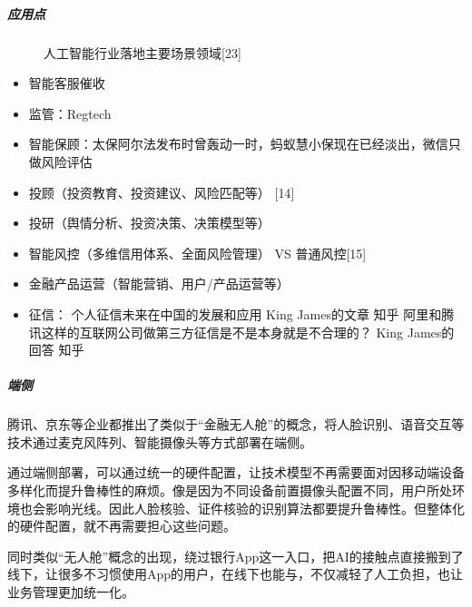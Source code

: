 \documentclass[letterpaper,11pt,english]{sphinxmanual}
\begin{document}
\subparagraph{应用点}
\label{\detokenize{chapter_project/AI_Finance:id3}}
\begin{figure}[H]
\centering
\capstart

\noindent{}
\caption{人工智能行业落地主要场景领域{[}23{]}}\label{\detokenize{chapter_project/AI_Finance:id31}}\end{figure}
\begin{itemize}
\item {} 
智能客服催收

\item {} 
监管：Regtech

\item {} 
智能保顾：太保阿尔法发布时曾轰动一时，蚂蚁慧小保现在已经淡出，微信只做风险评估

\item {} 
投顾（投资教育、投资建议、风险匹配等） {[}14{]}

\item {} 
投研（舆情分析、投资决策、决策模型等）

\item {} 
智能风控（多维信用体系、全面风险管理） VS 普通风控{[}15{]}

\item {} 
金融产品运营（智能营销、用户/产品运营等）

\item {} 
征信： 个人征信未来在中国的发展和应用 \sphinxhyphen{} King James的文章 \sphinxhyphen{} 知乎
阿里和腾讯这样的互联网公司做第三方征信是不是本身就是不合理的？ \sphinxhyphen{} King
James的回答 \sphinxhyphen{} 知乎

\end{itemize}


\subparagraph{端侧}
\label{\detokenize{chapter_project/AI_Finance:id4}}
腾讯、京东等企业都推出了类似于“金融无人舱”的概念，将人脸识别、语音交互等技术通过麦克风阵列、智能摄像头等方式部署在端侧。

通过端侧部署，可以通过统一的硬件配置，让技术模型不再需要面对因移动端设备多样化而提升鲁棒性的麻烦。像是因为不同设备前置摄像头配置不同，用户所处环境也会影响光线。因此人脸核验、证件核验的识别算法都要提升鲁棒性。但整体化的硬件配置，就不再需要担心这些问题。

同时类似“无人舱”概念的出现，绕过银行App这一入口，把AI的接触点直接搬到了线下，让很多不习惯使用App的用户，在线下也能与，不仅减轻了人工负担，也让业务管理更加统一化。
\end{document}
